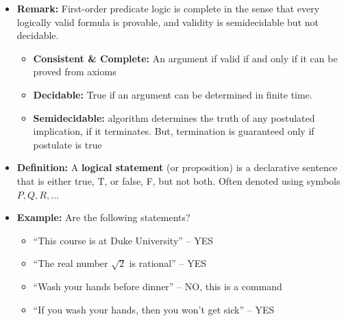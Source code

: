 \documentclass[11pt,twoside]{report}
\begin{document}
\begin{itemize}

\begin{itemize}
\item \textbf{Propositional logic}  (a.k.a.\ zeroth-order logic)  constructs logical statements from a primitive collection of  ``atomic'' statements

\item \textbf{Predicate logic}  (a.k.a.\ first-order predicate logic)  constructs logical statements from a primitive collection of statements \emph{with additional structure}
\end{itemize}

\item \textbf{Remark:} First-order predicate logic is complete in the sense that every logically valid formula is provable, and validity is semidecidable but not decidable. 
\begin{itemize}
\item  \textbf{Consistent \& Complete:}   An argument if valid if and only if it can be proved from axioms
\item \textbf{Decidable:}  True if an argument can be determined in finite time. 
\item  \textbf{Semidecidable:} algorithm determines the truth of any postulated implication, if it terminates. But, termination is guaranteed only if postulate is true
%
\end{itemize}





\item \textbf{Definition:}  A \textbf{logical statement} (or proposition) is a declarative sentence that is either true,  T,  or false, F, but not both. Often denoted using symbols $P, Q, R , \dots$%

\item \textbf{Example:} Are the following statements?
\begin{itemize}
\item ``This course is at Duke University'' -- YES
\item ``The real number $\sqrt{2}$ is rational''  -- YES
\item ``Wash your hands before dinner''  -- NO, this is a command
\item ``If you wash your hands, then you won't get sick'' -- YES
\end{itemize}



\end{itemize}
\end{document}
